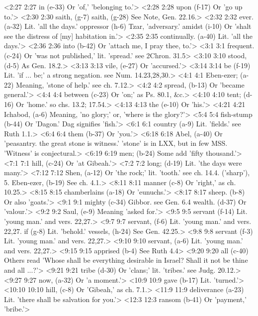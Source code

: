 <2:27 2:27  in (e-33)  Or 'of,' 'belonging to.'>
<2:28 2:28  upon (f-17)  Or 'go up to.'>
<2:30 2:30  saith, (g-7)  saith, (g-28)
  See Note, Gen. 22.16.>
<2:32 2:32  ever. (a-32) Lit. 'all the days.'
  oppressor (h-6)  Tzar, 'adversary.'
  amidst (i-10)  Or 'shalt see the distress of [my] habitation in.'>
<2:35 2:35  continually. (a-40)  Lit. 'all the days.'>
<2:36 2:36  into (b-42)  Or 'attach me, I pray thee, to.'>
<3:1 3:1  frequent. (c-24)  Or 'was not published,' lit. 'spread.' see 2Chron. 31.5>
<3:10 3:10  stood, (d-5)  As Gen. 18.2.>
<3:13 3:13  vile, (e-27)  Or 'accursed.'>
<3:14 3:14  be (f-19)  Lit. 'if ... be;' a strong negation. see Num. 14.23,28,30.>
<4:1 4:1  Eben-ezer; (a-22)  Meaning, 'stone of help.' see ch. 7.12.>
<4:2 4:2  spread, (b-13)  Or 'became general.'>
<4:4 4:4  between (c-23)  Or 'on;' as Ps. 80.1, &c.>
<4:10 4:10  tent; (d-16)  Or 'home.' so chs. 13.2; 17.54.>
<4:13 4:13  the (e-10)  Or 'his.'>
<4:21 4:21  Ichabod, (a-6)  Meaning, 'no glory;' or, 'where is the glory?'>
<5:4 5:4  fish-stump (b-44)  Or 'Dagon.' Dag signifies 'fish.'>
<6:1 6:1  country (a-9)  Lit. 'fields.' see Ruth 1.1.>
<6:4 6:4  them (b-37)  Or 'you.'>
<6:18 6:18  Abel, (a-40)  Or 'peasantry. the great stone is witness.' 'stone' is in  LXX, but in few MSS. 'Witness' is conjectural.>
<6:19 6:19  men; (b-24)  Some add 'fifty thousand.'>
<7:1 7:1  hill, (c-24)  Or 'at Gibeah.'>
<7:2 7:2  long; (d-19)  Lit. 'the days were many.'>
<7:12 7:12  Shen, (a-12)  Or 'the rock;' lit. 'tooth.' see ch. 14.4. ('sharp'), 5.
  Eben-ezer, (b-19)  See ch. 4.1.>
<8:11 8:11  manner (c-8)  Or 'right,' as ch. 10.25.>
<8:15 8:15  chamberlains (a-18)  Or 'eunuchs.'>
<8:17 8:17  sheep. (b-8)  Or also 'goats.'>
<9:1 9:1  mighty (c-34)  Gibbor. see Gen. 6.4
  wealth. (d-37)  Or 'valour.'>
<9:2 9:2  Saul, (e-9)  Meaning 'asked for.'>
<9:5 9:5  servant (f-14) Lit. 'young man.' and vers. 22,27.>
<9:7 9:7  servant, (f-6) Lit. 'young man.' and vers. 22,27.
  if (g-8)  Lit. 'behold.'
  vessels, (h-24)  See Gen. 42.25.>
<9:8 9:8  servant (f-3)  Lit. 'young man.' and vers. 22,27.>
<9:10 9:10  servant, (a-6)  Lit. 'young man.' and vers. 22,27.>
<9:15 9:15  apprised (b-4)  See Ruth 4.4>
<9:20 9:20  all (c-40)  Others read 'Whose shall be everything desirable in Israel?  Shall it not be thine and all ...?'>
<9:21 9:21  tribe (d-30)  Or 'clans;' lit. 'tribes.' see Judg. 20.12.>
<9:27 9:27  now, (a-32)  Or 'a moment.'>
<10:9 10:9  gave (b-17)  Lit. 'turned.'>
<10:10 10:10  hill, (c-8)  Or 'Gibeah,' as ch. 7.1.>
<11:9 11:9  deliverance (a-23)  Lit. 'there shall be salvation for you.'>
<12:3 12:3  ransom (b-41)  Or 'payment,' 'bribe.'>
